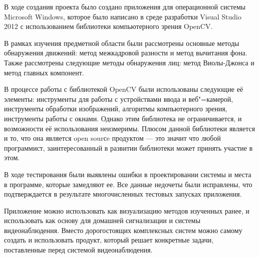\label{sec:final}


В ходе создания проекта было создано приложения для операционной системы Microsoft Windows, которое было написано в среде разработки Visual Studio 2012 с использованием библиотеки компьютерного зрения OpenCV.

В рамках изучения предметной области были рассмотрены основные методы обнаружения движений: метод межкадровой разности и метод вычитания фона. Также рассмотрены следующие методы обнаружения лиц: метод Виолы-Джонса и метод главных компонент.

В процессе работы с библиотекой OpenCV были использованы следующие её элементы: инструменты для работы с устройствами ввода и веб"=камерой, инструменты обработки изображений, алгоритмы компьютерного зрения, инструменты работы с окнами. Однако этим библиотека не ограничивается, и возможности её использования неизмеримы. Плюсом данной библиотеки является и то, что она является open sourсe продуктом --- это значит что любой программист, заинтересованный в развитии библиотеки может принять участие в этом.
 
В ходе тестирования были выявлены ошибки в проектировании системы и  места в программе, которые замедляют ее. Все данные недочеты были исправлены, что подтверждается в результате многочисленных тестовых запусках приложения.

Приложение можно использовать как визуализацию методов изученных ранее, и использовать как основу для домашней сигнализации и системы видеонаблюдения. Вместо дорогостоящих комплексных систем можно самому создать и использовать продукт, который решает конкретные задачи, поставленные перед системой видеонаблюдения.

